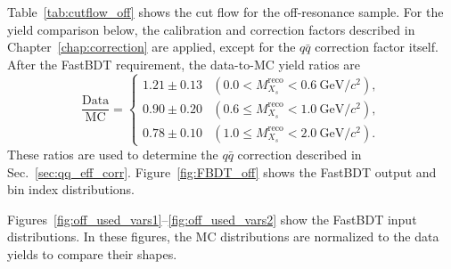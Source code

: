 Table~\ref{tab:cutflow_off} shows the cut flow for the off-resonance sample.
For the yield comparison below, the calibration and correction factors described in Chapter~\ref{chap:correction} are applied, except for the $q\bar{q}$ correction factor itself.
After the FastBDT requirement, the data-to-MC yield ratios are
\begin{equation}
\label{eq:off_resonance_ratio}
    \frac{\textrm{Data}}{\textrm{MC}} =
    \begin{cases}
    1.21 \pm 0.13 &
    (0.0 < M_{X_{s}}^{\textrm{reco}} < 0.6~\textrm{GeV}/c^{2}), \\[10pt]
    0.90 \pm 0.20 &
    (0.6 \leq M_{X_{s}}^{\textrm{reco}} < 1.0~\textrm{GeV}/c^{2}), \\[10pt]
    0.78 \pm 0.10 &
    (1.0 \leq M_{X_{s}}^{\textrm{reco}} < 2.0~\textrm{GeV}/c^{2}).
    \end{cases}
\end{equation}
These ratios are used to determine the $q\bar{q}$ correction described in Sec.~\ref{sec:qq_eff_corr}.
Figure~\ref{fig:FBDT_off} shows the FastBDT output and bin index distributions.

Figures~\ref{fig:off_used_vars1}--\ref{fig:off_used_vars2} show the FastBDT input distributions.
In these figures, the MC distributions are normalized to the data yields to compare their shapes.


